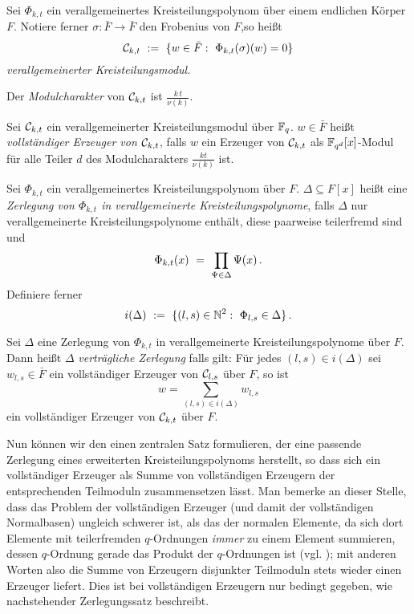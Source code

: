 \begin{definition}
  \label{def:verallgemeinerter_kreisteilungsmodul}
  Sei $\Phi_{k,t}$ ein verallgemeinertes Kreisteilungspolynom über einem
  endlichen Körper $F$. Notiere ferner $\sigma: \bar F\to \bar F$ 
  den Frobenius von $F$,so heißt
  \[ \C_{k,t} \speq{:=} \{ w \in \bar F:\ \Phi_{k,t}(\sigma)(w) = 0 \}\]
  \emph{verallgemeinerter Kreisteilungsmodul}.

  Der \emph{Modulcharakter} von $\mathcal{C}_{k,t}$ ist $\frac{k\,t}{\nu(k)}$.
\end{definition}

\begin{definition}
  \label{def:vollst_erzeuger}
  Sei $\mathcal{C}_{k,t}$ ein verallgemeinerter Kreisteilungsmodul über $\mathbb{F}_q$.
  $w \in \bar F$ heißt 
  \emph{vollständiger Erzeuger von $\mathcal{C}_{k,t}$}, falls
  $w$ ein Erzeuger von $\mathcal{C}_{k,t}$ als $\mathbb{F}_{q^d}[x]$-Modul 
  für alle Teiler $d$ des Modulcharakters $\frac{kt}{\nu(k)}$ ist.
\end{definition}

\begin{definition}
  Sei $\Phi_{k,t}$ ein verallgemeinertes Kreisteilungspolynom über $F$.
  $\Delta \subseteq F[x]$ heißt eine 
  \emph{Zerlegung von $\Phi_{k,t}$ in verallgemeinerte Kreisteilungspolynome}, 
  falls $\Delta$ nur verallgemeinerte Kreisteilungspolynome enthält, diese
  paarweise teilerfremd sind und
  \[ \Phi_{k,t}(x) \ =\  \prod_{\Psi \in \Delta} \Psi(x)\,. \]
  Definiere ferner
  \[ i(\Delta) \speq{:=} \{ (l,s) \in \N^2:\ 
    \Phi_{l,s} \in \Delta\}\,.\]
\end{definition}


\begin{definition}
  \label{def:vertraeglich}
  Sei $\Delta$ eine Zerlegung von $\Phi_{k,t}$ in verallgemeinerte
  Kreisteilungspolynome über $F$.
  Dann heißt $\Delta$ 
  \emph{verträgliche Zerlegung} falls gilt: Für jedes 
  $(l,s) \in i(\Delta)$ sei
  $w_{l,s} \in \bar F$ ein vollständiger Erzeuger von 
  $\mathcal{C}_{l,s}$ über $F$,
  so ist 
  \[ w = \sum_{(l,s) \in i(\Delta)} w_{l,s} \]
  ein vollständiger Erzeuger von $\mathcal{C}_{k,t}$ über $F$.
\end{definition}


Nun können wir den einen zentralen Satz formulieren, der eine passende
Zerlegung eines erweiterten Kreisteilungspolynoms herstellt, so dass sich ein
vollständiger Erzeuger als Summe von vollständigen Erzeugern der entsprechenden
Teilmoduln zusammensetzen lässt. Man bemerke an dieser Stelle, dass das Problem
der vollständigen Erzeuger (und damit der vollständigen Normalbasen) ungleich
schwerer ist, als das der normalen Elemente, da sich dort Elemente 
mit teilerfremden $q$-Ordnungen \emph{immer} zu einem Element summieren, dessen
$q$-Ordnung gerade das Produkt der $q$-Ordnungen ist 
(vgl. ); mit anderen Worten 
also die Summe von Erzeugern disjunkter Teilmoduln stets wieder einen Erzeuger
liefert. Dies ist bei vollständigen Erzeugern nur bedingt gegeben, wie
nachstehender Zerlegungssatz beschreibt.


